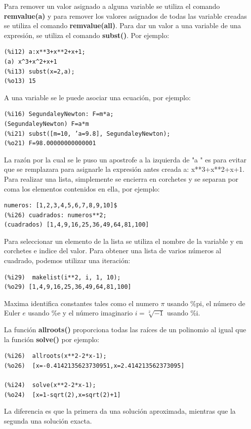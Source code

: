 \documentclass[a4paper]{article}
\begin{document}
Para remover un valor asignado a alguna variable se utiliza el comando \textbf{remvalue(a)} y para
remover los valores asignados de todas las variable creadas se utiliza el comando \textbf{remvalue(all)}. 
Para dar un valor a una variable de una expresión, se utiliza el comando \textbf{subst()}. Por ejemplo:


\begin{verbatim}
(%i12) a:x**3+x**2+x+1;
(a) x^3+x^2+x+1
(%i13) subst(x=2,a);
(%o13) 15
\end{verbatim}

A una variable se le puede asociar una ecuación, por ejemplo:

\begin{verbatim}
(%i16) SegundaleyNewton: F=m*a;
(SegundaleyNewton) F=a*m
(%i21) subst([m=10, ’a=9.8], SegundaleyNewton);
(%o21) F=98.00000000000001
\end{verbatim}

La razón por la cual se le puso un apostrofe a la izquierda de "a " es para evitar que se
remplazara para asignarle la expresión antes creada a: x**3+x**2+x+1.
Para realizar una lista, simplemente se encierra en corchetes y se separan por coma los elementos contenidos en ella, por ejemplo:

\begin{verbatim}
numeros: [1,2,3,4,5,6,7,8,9,10]$
(%i26) cuadrados: numeros**2;
(cuadrados) [1,4,9,16,25,36,49,64,81,100]
\end{verbatim}

Para seleccionar un elemento de la lista se utiliza el nombre de la variable y en corchetes
e indice del valor. Para obtener una lista de  varios números al cuadrado, podemos utilizar una iteración:

\begin{verbatim}
(%i29)	makelist(i**2, i, 1, 10);
(%o29) [1,4,9,16,25,36,49,64,81,100]
\end{verbatim}

Maxima identifica constantes tales como el numero $\pi$ usando \%pi, el número de Euler $e$ usando \%e y el número imaginario $i=\sqrt[2]{-1}$ usando \%i. 

La función \textbf{allroots()} proporciona todas las raíces de un polinomio al igual que la función \textbf{solve()} por ejemplo:

\begin{verbatim}
(%i26)	allroots(x**2-2*x-1);
(%o26)	[x=-0.4142135623730951,x=2.414213562373095]

(%i24)	solve(x**2-2*x-1);
(%o24)	[x=1-sqrt(2),x=sqrt(2)+1]
\end{verbatim}
La diferencia es que la primera da una solución aproximada, mientras que la segunda una solución exacta.
\end{document}
